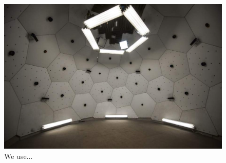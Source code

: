 \begin{figure}[t]
	\includegraphics[width=\linewidth]{fig_system/dome_lighting}
	\caption{We use...}
\end{figure}


